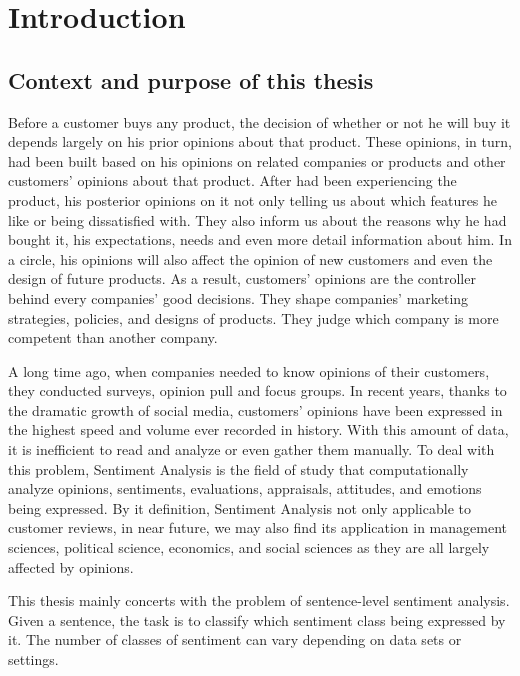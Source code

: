 \chapter{Introduction}
\section{Context and purpose of this thesis}
Before a customer buys any product, the decision of whether or not he will buy it depends largely on his prior opinions about that product. 
These opinions, in turn, had been built based on his opinions on related companies or products and other customers' opinions about that product.  
After had been experiencing the product, his posterior opinions on it not only telling us about which features he like or being dissatisfied with.
They also inform us about the reasons why he had bought it, his expectations, needs and even more detail information about him.
In a circle, his opinions will also affect the opinion of new customers and even the design of future products.
As a result, customers' opinions are the controller behind every companies' good decisions. 
They shape companies' marketing strategies, policies, and designs of products.
They judge which company is more competent than another company.

A long time ago, when companies needed to know opinions of their customers, they conducted surveys, opinion pull and focus groups\cite{liu2012sentiment}. 
In recent years, thanks to the dramatic growth of social media, customers' opinions have been expressed in the highest speed and volume ever recorded in history.
With this amount of data, it is inefficient to read and analyze or even gather them manually.
To deal with this problem, Sentiment Analysis is the field of study that computationally analyze opinions, sentiments, evaluations, appraisals, attitudes, and emotions being expressed\cite{liu2012sentiment}.
By it definition, Sentiment Analysis not only applicable to customer reviews, in near future, we may also find its application in management sciences, political science, economics, and social sciences as they are all largely affected by opinions\cite{liu2012sentiment}. 

This thesis mainly concerts with the problem of sentence-level sentiment analysis. 
Given a sentence, the task is to classify which sentiment class being expressed by it\cite{liu2012sentiment}.
The number of classes of sentiment can vary depending on data sets or settings\cite{Rotten-Tomato}\cite{socher2013recursive}.


